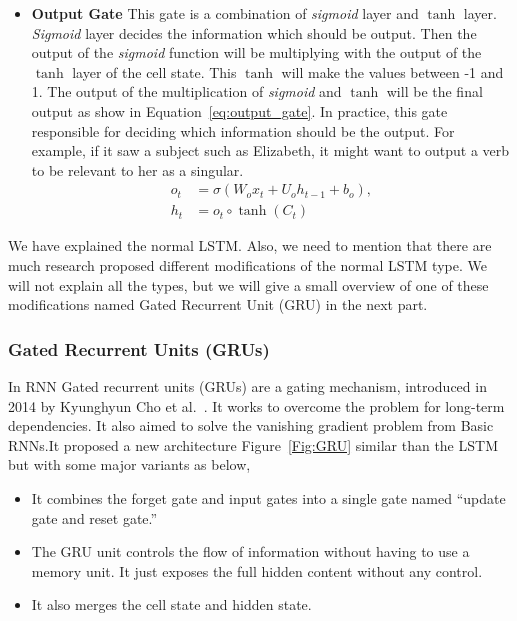 \begin{itemize}
    \item \textbf{Output Gate} This gate is a combination of \textit{sigmoid} layer and \textit{$\tanh$} layer. \textit{Sigmoid} layer decides the information which should be output. Then the output of the  \textit{sigmoid} function will be multiplying with the output of the \textit{$\tanh$} layer of the cell state. This \textit{$\tanh$} will make the values between -1 and 1. The output of the multiplication of \textit{sigmoid} and \textit{$\tanh$} will be the final output as show in Equation~\eqref{eq:output_gate}. In practice, this gate responsible for deciding which information should be the output. For example, if it saw a subject such as Elizabeth, it might want to output a verb to be relevant to her as a singular.%
\begin{subequations}\label{eq:output_gate}
\begin{align}
o_t  &= \sigma(W_o  x_t + U_o h_{t-1} + b_o),\\
h_t  &= o_t \circ \tanh(C_t)
\end{align}
\end{subequations}%
\end{itemize}

    We have explained the normal LSTM. Also, we need to mention that there are much research proposed different modifications of the normal LSTM type. We will not explain all the types, but we will give a small overview of one of these modifications named Gated Recurrent Unit (GRU) in the next part.

\subsubsection{Gated Recurrent Units (GRUs)}

In RNN Gated recurrent units (GRUs) are a gating mechanism, introduced in 2014 by Kyunghyun Cho et al.~\cite{Cho_et_al}. It works to overcome the problem for long-term dependencies. It also aimed to solve the vanishing gradient problem from Basic RNNs.It proposed a new architecture Figure~\ref{Fig:GRU} similar than the LSTM but with some major variants as below,
\begin{itemize}
  
\item It combines the forget gate and input gates into a single gate named “update gate and reset gate.”
\item The GRU unit controls the flow of information without having to use a memory unit. It just exposes the full hidden content without any control.
\item It also merges the cell state and hidden state.
  
\end{itemize}%

